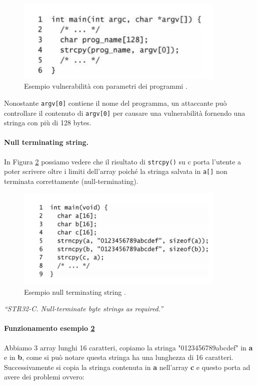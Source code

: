 \begin{figure}[H]
    \centering
    \includegraphics[width=10cm, keepaspectratio]{capitoli/secure_coding/img/cap_2/parametri_funzioni.png}
    \caption{Esempio vulnerabilità con parametri dei programmi .}\label{fig:parametri_programmi}
\end{figure}

Nonostante \verb|argv[0]| contiene il nome del programma, un attaccante può
controllare il contenuto di \verb|argv[0]| per causare una vulnerabilità fornendo
una stringa con più di 128 bytes.

\paragraph{Null terminating string.}
In Figura \ref{fig:null_string} possiamo vedere che il risultato di \verb|strcpy()|
su c porta l'utente a poter scrivere oltre i limiti dell'array poiché la stringa
salvata in \verb|a[]| non terminata correttamente (null-terminating).


\begin{figure}[H]
    \centering
    \includegraphics[width=10cm, keepaspectratio]{capitoli/secure_coding/img/cap_2/null_string.png}
    \caption{Esempio null terminating string .}\label{fig:null_string}
\end{figure}

\textit{“STR32-C. Null-terminate byte strings as
    required.”}

\paragraph{Funzionamento esempio \ref{fig:null_string}}
Abbiamo 3 array lunghi 16 caratteri, copiamo la stringa "0123456789abcdef"
in \textbf{a} e in \textbf{b}, come si può notare questa stringa ha una lunghezza di
16 caratteri. Successivamente si copia la stringa contenuta in \textbf{a}
nell'array \textbf{c} e questo porta ad avere dei problemi ovvero:

